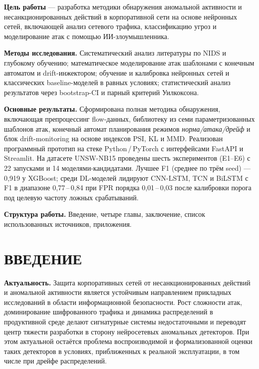 \documentclass[14pt, a4paper]{extarticle}
\begin{document}
\textbf{Цель работы} --- разработка методики обнаружения аномальной активности
и несанкционированных действий в корпоративной сети на основе нейронных сетей,
включающей анализ сетевого трафика, классификацию угроз и моделирование атак
с помощью ИИ-злоумышленника.

\textbf{Методы исследования.} Систематический анализ литературы по NIDS и
глубокому обучению; математическое моделирование атак шаблонами с конечным
автоматом и drift-инжектором; обучение и калибровка нейронных сетей и
классических baseline-моделей в равных условиях; статистический анализ
результатов через bootstrap-CI и парный критерий Уилкоксона.

\textbf{Основные результаты.} Сформирована полная методика обнаружения,
включающая препроцессинг flow-данных, библиотеку из семи параметризованных
шаблонов атак, конечный автомат планирования режимов
\emph{норма/атака/дрейф} и блок drift-monitoring на основе индексов PSI,
KL и MMD. Реализован программный прототип на стеке Python\,/\,PyTorch
с интерфейсами FastAPI и Streamlit. На датасете UNSW-NB15 проведены шесть
экспериментов (E1--E6) с 22 запусками и 14 моделями-кандидатами. Лучшее
F1 (среднее по трём seed) --- 0{,}919 у XGBoost; среди DL-моделей лидируют
CNN-LSTM, TCN и BiLSTM с F1 в диапазоне 0{,}77\,--\,0{,}84 при FPR порядка
0{,}01\,--\,0{,}03 после калибровки порога под целевую частоту ложных
срабатываний.

\textbf{Структура работы.} Введение, четыре главы, заключение, список
использованных источников, приложения.

\newpage

\tableofcontents
\newpage

\section*{ВВЕДЕНИЕ}

\textbf{Актуальность.} Защита корпоративных сетей от несанкционированных
действий и аномальной активности является устойчивым направлением
прикладных исследований в области информационной безопасности. Рост
сложности атак, доминирование шифрованного трафика и динамика распределений
в продуктивной среде делают сигнатурные системы недостаточными и переводят
центр тяжести разработки в сторону нейросетевых аномальных детекторов. При
этом актуальной остаётся проблема воспроизводимой и формализованной оценки
таких детекторов в условиях, приближенных к реальной эксплуатации, в том
числе при дрейфе распределений.
\end{document}
